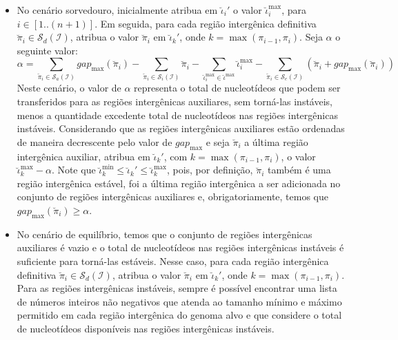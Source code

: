 \begin{itemize}
\begin{itemize}
    \item No cenário sorvedouro, inicialmente atribua em $\breve\iota_{i}'$ o valor $\breve\iota^{\max}_i$, para $i \in [1..({n+1})]$. Em seguida, para cada região intergênica definitiva $\breve\pi_i \in \mathcal{S}_{d}(\mathcal{I})$, atribua o valor $\breve\pi_i$ em $\breve\iota_{k}'$, onde $k = \max(\pi_{i-1},\pi_i)$. Seja $\alpha$ o seguinte valor:
  $$\alpha = \sum_{\breve\pi_i \in \mathcal{S}_{a}(\mathcal{I})} gap_{\max}(\breve\pi_i) - \sum_{\breve\pi_i \in \mathcal{S}_{i}(\mathcal{I})} \breve\pi_i - \sum_{\breve\iota_{i}^{\max}  \in \breve\iota^{\max}} \breve\iota_{i}^{\max} - \sum_{\breve\pi_i \in \mathcal{S}_{e}(\mathcal{I})} (\breve\pi_i + gap_{\max}(\breve\pi_i))$$
    Neste cenário, o valor de $\alpha$ representa o total de nucleotídeos que podem ser transferidos para as regiões intergênicas auxiliares, sem torná-las instáveis, menos a quantidade excedente total de nucleotídeos nas regiões intergênicas instáveis. Considerando que as regiões intergênicas auxiliares estão ordenadas de maneira decrescente pelo valor de $gap_{\max}$ e seja $\breve\pi_i$ a última região intergênica auxiliar, atribua em $\breve\iota_{k}'$, com $k = \max(\pi_{i-1},\pi_i)$, o valor $\breve\iota^{\max}_k - \alpha$. Note que $\breve\iota^{\min}_k \le \breve\iota_{k}' \le \breve\iota^{\max}_k$, pois, por definição, $\breve\pi_i$ também é uma região intergênica estável, foi a última região intergênica a ser adicionada no conjunto de regiões intergênicas auxiliares e, obrigatoriamente, temos que $gap_{\max}(\breve\pi_i) \ge \alpha$.

    \item No cenário de equilíbrio, temos que o conjunto de regiões intergênicas auxiliares é vazio e o total de nucleotídeos nas regiões intergênicas instáveis é suficiente para torná-las estáveis. Nesse caso, para cada região intergênica definitiva $\breve\pi_i \in \mathcal{S}_{d}(\mathcal{I})$, atribua o valor $\breve\pi_i$ em $\breve\iota_{k}'$, onde $k = \max(\pi_{i-1},\pi_i)$. Para as regiões intergênicas instáveis, sempre é possível encontrar uma lista de números inteiros não negativos que atenda ao tamanho mínimo e máximo permitido em cada região intergênica do genoma alvo e que considere o total de nucleotídeos disponíveis nas regiões intergênicas instáveis.
  \end{itemize}
\end{itemize}

